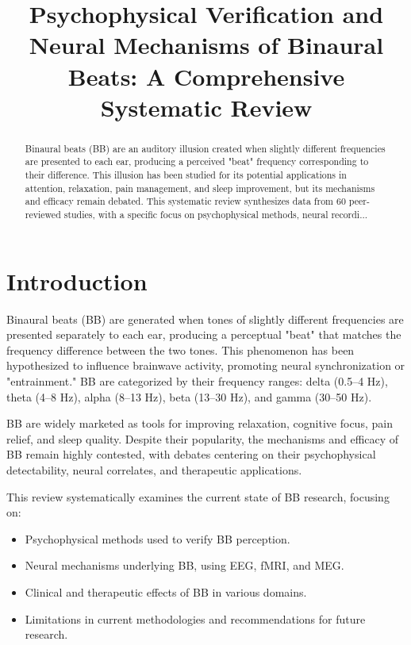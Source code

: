 \documentclass[12pt]{article}
\title{Psychophysical Verification and Neural Mechanisms of Binaural Beats: A Comprehensive Systematic Review}
\author{}
\date{}
\begin{document}
\maketitle

\begin{abstract}
Binaural beats (BB) are an auditory illusion created when slightly different frequencies are presented to each ear, producing a perceived "beat" frequency corresponding to their difference. This illusion has been studied for its potential applications in attention, relaxation, pain management, and sleep improvement, but its mechanisms and efficacy remain debated. This systematic review synthesizes data from 60 peer-reviewed studies, with a specific focus on psychophysical methods, neural recordi...
\end{abstract}

\tableofcontents

\section{Introduction}

Binaural beats (BB) are generated when tones of slightly different frequencies are presented separately to each ear, producing a perceptual "beat" that matches the frequency difference between the two tones. This phenomenon has been hypothesized to influence brainwave activity, promoting neural synchronization or "entrainment." BB are categorized by their frequency ranges: delta (0.5–4 Hz), theta (4–8 Hz), alpha (8–13 Hz), beta (13–30 Hz), and gamma (30–50 Hz).

BB are widely marketed as tools for improving relaxation, cognitive focus, pain relief, and sleep quality. Despite their popularity, the mechanisms and efficacy of BB remain highly contested, with debates centering on their psychophysical detectability, neural correlates, and therapeutic applications.

This review systematically examines the current state of BB research, focusing on:
\begin{itemize}
    \item Psychophysical methods used to verify BB perception.
    \item Neural mechanisms underlying BB, using EEG, fMRI, and MEG.
    \item Clinical and therapeutic effects of BB in various domains.
    \item Limitations in current methodologies and recommendations for future research.
\end{itemize}
\end{document}
